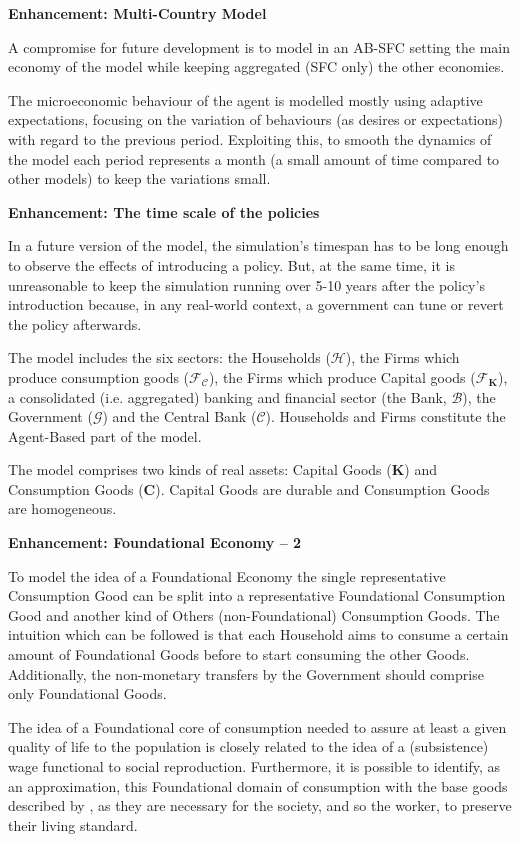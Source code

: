\documentclass[a4paper, headings=standardclasses]{scrartcl}
\newenvironment{enh}[1][]{\begin{framed}\noindent\textbf{Enhancement: #1}\par}{\end{framed}}
\begin{document}
\begin{enh}[Multi-Country Model]
    A compromise for future development is to model in an AB-SFC setting the main economy of the model while keeping aggregated (SFC only) the other economies.
\end{enh}

The microeconomic behaviour of the agent is modelled mostly using adaptive expectations, focusing on the variation of behaviours (as desires or expectations) with regard to the previous period.
Exploiting this, to smooth the dynamics of the model each period represents a month (a small amount of time compared to other models) to keep the variations small.

\begin{enh}[The time scale of the policies]
    In a future version of the model, the simulation's timespan has to be long enough to observe the effects of introducing a policy. But, at the same time, it is unreasonable to keep the simulation running over 5-10 years after the policy's introduction because, in any real-world context, a government can tune or revert the policy afterwards.
\end{enh}

The model includes the six sectors: the Households ($\mathcal{H}$), the Firms which produce consumption goods ($\mathcal{F}_{\mathcal{C}}$), the Firms which produce Capital goods ($\mathcal{F}_{\mathbf{K}}$), a consolidated (i.e. aggregated) banking and financial sector (the Bank, $\mathcal{B}$), the Government ($\mathcal{G}$) and the Central Bank ($\mathcal{C}$). Households and Firms constitute the Agent-Based part of the model.

The model comprises two kinds of real assets: Capital Goods ($\mathbf{K}$) and Consumption Goods ($\mathbf{C}$).
Capital Goods are durable and Consumption Goods are homogeneous.

\begin{enh}[Foundational Economy -- 2]
    To model the idea of a Foundational Economy the single representative Consumption Good can be split into a representative Foundational Consumption Good and another kind of Others (non-Foundational) Consumption Goods.
    The intuition which can be followed is that each Household aims to consume a certain amount of Foundational Goods before to start consuming the other Goods. Additionally, the non-monetary transfers by the Government should comprise only Foundational Goods.

    The idea of a Foundational core of consumption needed to assure at least a given quality of life to the population is closely related to the idea of a (subsistence) wage functional to social reproduction.
    Furthermore, it is possible to identify, as an approximation, this Foundational domain of consumption with the base goods described by \textcite{sraffa1960}, as they are necessary for the society, and so the worker, to preserve their living standard.
\end{enh}
\end{document}
